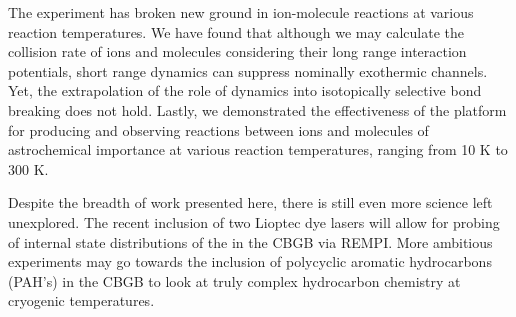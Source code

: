 The experiment has broken new ground in ion-molecule reactions at various reaction temperatures. We have found that although we may calculate the collision rate of ions and molecules considering their long range interaction potentials, short range dynamics can suppress nominally exothermic channels. Yet, the extrapolation of the role of dynamics into isotopically selective bond breaking does not hold. Lastly, we demonstrated the effectiveness of the platform for producing and observing reactions between ions and molecules of astrochemical importance at various reaction temperatures, ranging from 10 K to 300 K.

Despite the breadth of work presented here, there is still even more science left unexplored. The recent inclusion of two Lioptec dye lasers will allow for probing of internal state distributions of the  in the CBGB via REMPI. More ambitious experiments may go towards the inclusion of polycyclic aromatic hydrocarbons (PAH's) in the CBGB to look at truly complex hydrocarbon chemistry at cryogenic temperatures.